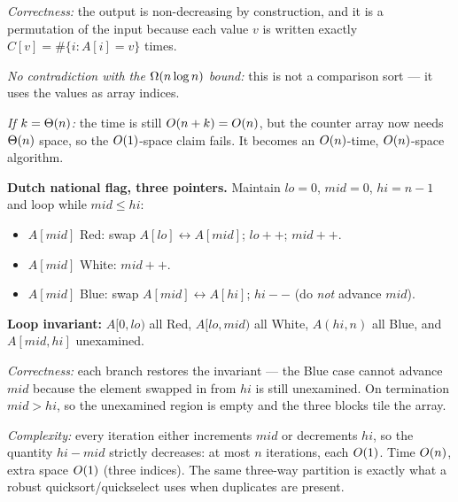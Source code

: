 \emph{Correctness:} the output is non-decreasing by construction, and it is a permutation of the
input because each value $v$ is written exactly $C[v]=\#\{i:A[i]=v\}$ times.

\emph{No contradiction with the $\Omega(n\log n)$ bound:} this is not a comparison sort --- it uses
the values as array indices.

\emph{If $k=\Theta(n)$:} the time is still $O(n+k)=O(n)$, but the counter array now needs $\Theta(n)$
space, so the $O(1)$-space claim fails. It becomes an $O(n)$-time, $O(n)$-space algorithm.

 \textbf{Dutch national flag, three pointers.} Maintain $\mathit{lo}=0$, $\mathit{mid}=0$,
$\mathit{hi}=n-1$ and loop while $\mathit{mid}\le \mathit{hi}$:
\begin{itemize}
  \item $A[\mathit{mid}]$ Red: swap $A[\mathit{lo}]\leftrightarrow A[\mathit{mid}]$; $\mathit{lo}{+}{+}$; $\mathit{mid}{+}{+}$.
  \item $A[\mathit{mid}]$ White: $\mathit{mid}{+}{+}$.
  \item $A[\mathit{mid}]$ Blue: swap $A[\mathit{mid}]\leftrightarrow A[\mathit{hi}]$; $\mathit{hi}{-}{-}$ (do \emph{not} advance $\mathit{mid}$).
\end{itemize}
\textbf{Loop invariant:} $A[0,\mathit{lo})$ all Red, $A[\mathit{lo},\mathit{mid})$ all White,
$A(\mathit{hi},n)$ all Blue, and $A[\mathit{mid},\mathit{hi}]$ unexamined.

\emph{Correctness:} each branch restores the invariant --- the Blue case cannot advance
$\mathit{mid}$ because the element swapped in from $\mathit{hi}$ is still unexamined. On
termination $\mathit{mid}>\mathit{hi}$, so the unexamined region is empty and the three blocks
tile the array.

\emph{Complexity:} every iteration either increments $\mathit{mid}$ or decrements $\mathit{hi}$,
so the quantity $\mathit{hi}-\mathit{mid}$ strictly decreases: at most $n$ iterations, each
$O(1)$. Time $O(n)$, extra space $O(1)$ (three indices). The same three-way partition is exactly
what a robust quicksort/quickselect uses when duplicates are present.

